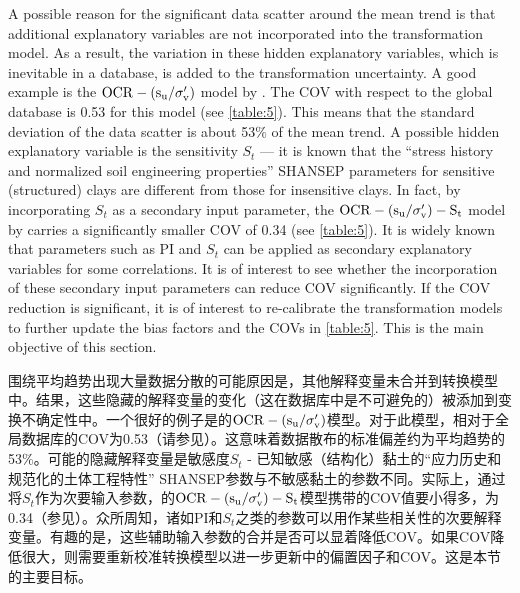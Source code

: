 \begin{paracol}{2}
    A possible reason for the significant data scatter around the mean trend is that additional explanatory variables are not incorporated into the transformation model. As a result, the variation in these hidden explanatory variables, which is inevitable in a database, is added to the transformation uncertainty. A good example is the $\rm{OCR}-(s_u/\sigma_v')$ model by \citet{Jamiolkowski198557}. The COV with respect to the global database is 0.53 for this model (see \autoref{table:5}). This means that the standard deviation of the data scatter is about 53$\%$ of the mean trend. A possible hidden explanatory variable is the sensitivity $S_t$ — it is known that the “stress history and normalized soil engineering properties” SHANSEP parameters for sensitive (structured) clays are different from those for insensitive clays. In fact, by incorporating $S_t$ as a secondary input parameter, the $\rm{OCR}-(s_u/\sigma_v')-S_t$ model by \cite{Ching2012522}carries a significantly smaller COV of 0.34 (see \autoref{table:5}). It is widely known that parameters such as PI and $S_t$ can be applied as secondary explanatory variables for some correlations. It is of interest to see whether the incorporation of these secondary input parameters can reduce COV significantly. If the COV reduction is significant, it is of interest to re-calibrate the transformation models to further update the bias factors and the COVs in \autoref{table:5}. This is the main objective of this section.

    \switchcolumn

    围绕平均趋势出现大量数据分散的可能原因是，其他解释变量未合并到转换模型中。结果，这些隐藏的解释变量的变化（这在数据库中是不可避免的）被添加到变换不确定性中。一个很好的例子是\citet{Jamiolkowski198557}的$\rm{OCR}-(s_u/\sigma_v')$模型。对于此模型，相对于全局数据库的COV为0.53（请参见）。这意味着数据散布的标准偏差约为平均趋势的53$\%$。可能的隐藏解释变量是敏感度$S_t$ - 已知敏感（结构化）黏土的“应力历史和规范化的土体工程特性” SHANSEP参数与不敏感黏土的参数不同。实际上，通过将$S_t$作为次要输入参数，\cite{Ching2012522}的$\rm{OCR}-(s_u/\sigma_v')-S_t$模型携带的COV值要小得多，为0.34（参见）。众所周知，诸如PI和$S_t$之类的参数可以用作某些相关性的次要解释变量。有趣的是，这些辅助输入参数的合并是否可以显着降低COV。如果COV降低很大，则需要重新校准转换模型以进一步更新中的偏置因子和COV。这是本节的主要目标。

\end{paracol}


